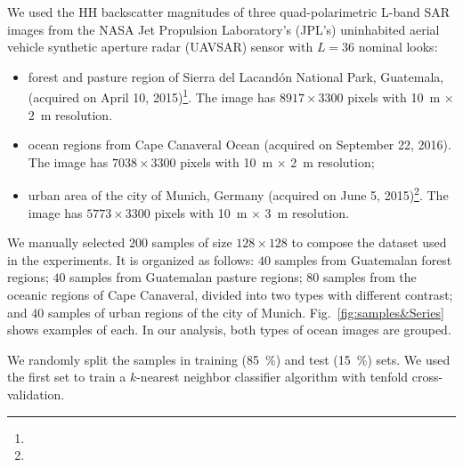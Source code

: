 We used the HH backscatter magnitudes of three quad-polarimetric L-band SAR images from the NASA Jet Propulsion Laboratory’s (JPL’s) uninhabited aerial vehicle synthetic aperture radar (UAVSAR) sensor with $L=36$ nominal looks:
\begin{itemize}
	\item forest and pasture region of Sierra del Lacandón National Park, Guatemala, (acquired on April 10, 2015)\footnote{}. 
	The image has $8917 \times 3300$ pixels with 
	\SI[inter-unit-product =$\cdot$]{10}{\meter} $\times$ \SI[inter-unit-product =$\cdot$]{2}{\meter} resolution.
	\item ocean regions from Cape Canaveral Ocean (acquired on September 22, 2016).
	The image has $7038 \times 3300$ pixels with 
	\SI[inter-unit-product =$\cdot$]{10}{\meter} $\times$ \SI[inter-unit-product =$\cdot$]{2}{\meter} resolution;
	\item urban area of the city of Munich, Germany (acquired on June 5, 2015)\footnote{}.
	The image has $5773 \times 3300$ pixels with 
	\SI[inter-unit-product =$\cdot$]{10}{\meter} $\times$ \SI[inter-unit-product =$\cdot$]{3}{\meter} resolution.
\end{itemize}

We manually selected $200$ samples of size $128 \times 128$ to compose the dataset used in the experiments.
It is organized as follows:
$40$ samples from Guatemalan forest regions;
$40$ samples from Guatemalan pasture regions;
$80$ samples from the oceanic regions of Cape Canaveral, divided into two types with different contrast; and
$40$ samples of urban regions of the city of Munich.
Fig.~\ref{fig:samples&Series} shows examples of each. In our analysis, both types of ocean images are grouped.

We randomly split the samples in training (\SI{85}{\percent}) and test (\SI{15}{\percent}) sets.
We used the first set to train a $k$-nearest neighbor classifier algorithm with tenfold
cross-validation.

